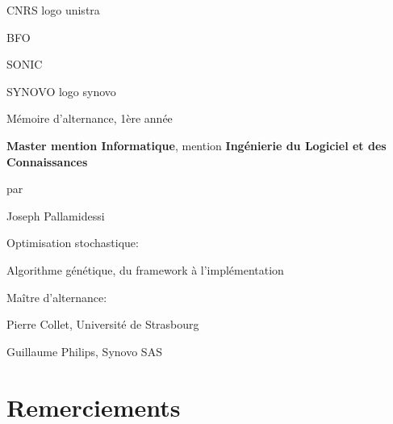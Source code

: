 \documentclass[french, 11pt]{memoir}
\begin{document}
CNRS logo unistra

BFO

SONIC

SYNOVO logo synovo

Mémoire d'alternance, 1ère année

\textbf{Master mention Informatique}, mention \textbf{Ingénierie du
	Logiciel et des Connaissances}

par

Joseph Pallamidessi

Optimisation stochastique:

Algorithme génétique, du framework à l'implémentation

Maître d'alternance:

Pierre Collet, Université de Strasbourg

Guillaume Philips, Synovo SAS

\newpage

\tableofcontents

\section{Remerciements}\label{remerciements}
\end{document}
